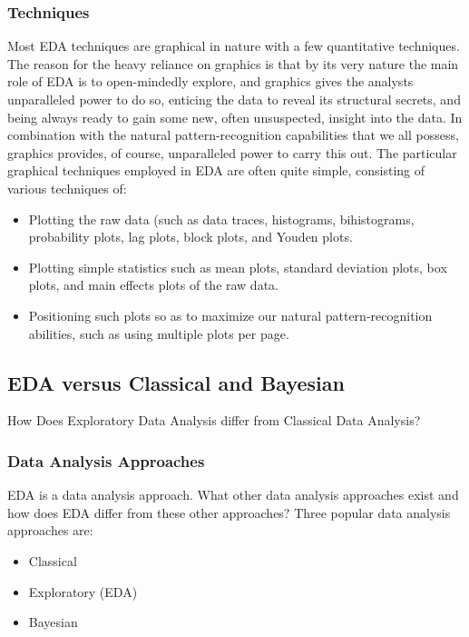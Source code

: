 \documentclass[]{book}
\providecommand{\tightlist}{%
  \setlength{\itemsep}{0pt}\setlength{\parskip}{0pt}}
\theoremstyle{definition}
\theoremstyle{definition}
\theoremstyle{definition}
\theoremstyle{remark}
\begin{document}
\subsubsection{Techniques}\label{techniques}

Most EDA techniques are graphical in nature with a few quantitative
techniques. The reason for the heavy reliance on graphics is that by its
very nature the main role of EDA is to open-mindedly explore, and
graphics gives the analysts unparalleled power to do so, enticing the
data to reveal its structural secrets, and being always ready to gain
some new, often unsuspected, insight into the data. In combination with
the natural pattern-recognition capabilities that we all possess,
graphics provides, of course, unparalleled power to carry this out. The
particular graphical techniques employed in EDA are often quite simple,
consisting of various techniques of:

\begin{itemize}
\tightlist
\item
  Plotting the raw data (such as data traces, histograms, bihistograms,
  probability plots, lag plots, block plots, and Youden plots.
\item
  Plotting simple statistics such as mean plots, standard deviation
  plots, box plots, and main effects plots of the raw data.
\item
  Positioning such plots so as to maximize our natural
  pattern-recognition abilities, such as using multiple plots per page.
\end{itemize}

\subsection{EDA versus Classical and
Bayesian}\label{eda-versus-classical-and-bayesian}

How Does Exploratory Data Analysis differ from Classical Data Analysis?

\subsubsection{Data Analysis Approaches}\label{data-analysis-approaches}

EDA is a data analysis approach. What other data analysis approaches
exist and how does EDA differ from these other approaches? Three popular
data analysis approaches are:

\begin{itemize}
\tightlist
\item
  Classical
\item
  Exploratory (EDA)
\item
  Bayesian
\end{itemize}
\end{document}

